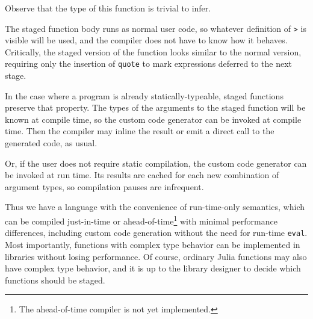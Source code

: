 \documentclass[9pt]{sigplanconf}
\begin{document}
Observe that the type of this function is trivial to infer.

The staged function body runs as normal user code, so whatever definition
of {\tt >} is visible will be used, and the compiler does not have to know
how it behaves. Critically, the staged version of the function looks
similar to the normal version, requiring only the insertion of {\tt quote}
to mark expressions deferred to the next stage.

In the case where a program is already statically-typeable, staged
functions preserve that property. The types of the arguments to the
staged function will be known at compile time, so the custom code
generator can be invoked at compile time. Then the compiler may inline
the result or emit a direct call to the generated code, as usual.

Or, if the user does not require static compilation, the custom code
generator can be invoked at run time. Its results are cached for each new
combination of argument types, so compilation pauses are infrequent.

Thus we have a language with the convenience of run-time-only semantics,
which can be compiled just-in-time or ahead-of-time\footnote{The ahead-of-time
compiler is not yet implemented.} with minimal performance differences,
including custom code generation without the need for run-time {\tt eval}.
Most importantly, functions with complex type behavior can be implemented
in libraries without losing performance. Of course, ordinary Julia
functions may also have complex type behavior, and it is up to the
library designer to decide which functions should be staged.



\end{document}
